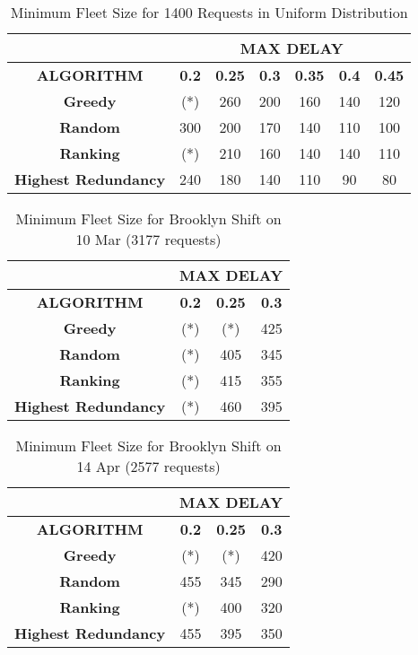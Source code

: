 \documentclass[urop]{socreport}
\begin{document}
\begin{table}[h!]
    \centering
    \begin{tabular}{|c|c|c|c|c|c|c|}
        \hline
         & \multicolumn{6}{|c|}{\textbf{MAX DELAY}}\\
         \hline
         \textbf{ALGORITHM} & \textbf{0.2} & \textbf{0.25}& \textbf{0.3}& \textbf{0.35}& \textbf{0.4}& \textbf{0.45}\\
         \hline \hline
         \textbf{Greedy} & (*) & 260 & 200 & 160 & 140 & 120\\
         \hline
         \textbf{Random} & 300 & 200 & 170 & 140 & 110 & 100 \\
         \hline
         \textbf{Ranking} & (*) & 210 & 160 & 140 & 140 & 110 \\
         \hline
         \textbf{Highest Redundancy} & 240 & 180 & 140 & 110 & 90 & 80 \\
        \hline
    \end{tabular}
    \caption{Minimum Fleet Size for 1400 Requests in Uniform Distribution}
    \label{tab:exp1_1400}
\end{table}



\begin{table}[h!]
    \centering
    \begin{tabular}{|c|c|c|c|}
        \hline
         & \multicolumn{3}{|c|}{\textbf{MAX DELAY}}\\
         \hline
         \textbf{ALGORITHM} & \textbf{0.2} & \textbf{0.25}& \textbf{0.3}\\
         \hline \hline
         \textbf{Greedy} & (*) & (*) & 425\\
         \hline
         \textbf{Random} & (*) & 405 & 345\\
         \hline
         \textbf{Ranking} & (*) & 415 & 355\\
         \hline
         \textbf{Highest Redundancy} & (*) & 460 & 395\\
        \hline
    \end{tabular}
    \caption{Minimum Fleet Size for Brooklyn Shift on 10 Mar (3177 requests)}
    \label{tab:exp2_1003}
\end{table}

\begin{table}[h!]
    \centering
    \begin{tabular}{|c|c|c|c|}
        \hline
         & \multicolumn{3}{|c|}{\textbf{MAX DELAY}}\\
         \hline
         \textbf{ALGORITHM} & \textbf{0.2} & \textbf{0.25}& \textbf{0.3}\\
         \hline \hline
         \textbf{Greedy} & (*) & (*) & 420\\
         \hline
         \textbf{Random} & 455 & 345 & 290\\
         \hline
         \textbf{Ranking} & (*) & 400 & 320\\
         \hline
         \textbf{Highest Redundancy} & 455 & 395 & 350\\
        \hline
    \end{tabular}
    \caption{Minimum Fleet Size for Brooklyn Shift on 14 Apr (2577 requests)}
    \label{tab:exp2_1404}
\end{table}
\end{document}
